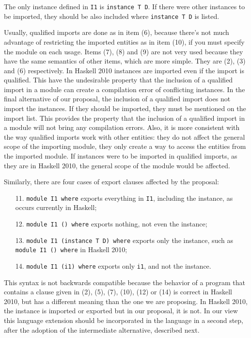 \documentclass[msc]{ppgccufmg}
\begin{document}
The only instance defined in \texttt{I1} is
\texttt{instance T D}.  If there were other instances to be imported, they should be also included
where \texttt{instance T D} is listed.

Usually, qualified imports are done as in item (6), because there's not much advantage of restricting the imported entities as in item (10), if you must specify the module on each usage.
Items (7), (8) and (9) are not very used because they have the same semantics of other items, which are more simple.
They are (2), (3) and (6) respectively.
In Haskell 2010 instances are imported even if the import is qualified.
This have the undesirable property that the inclusion of a qualified import in a module can create a compilation error of conflicting instances.
In the final alternative of our proposal, the inclusion of a qualified import does not import the instances.
If they should be imported, they must be mentioned on the import list.
This provides the property that the inclusion of a qualified import in a module will not bring any compilation errors.
Also, it is more consistent with the way qualified imports work with other entities: they do not affect the general scope of the importing module, they only create a way to access the entities from the imported module.
If instances were to be imported in qualified imports, as they are in Haskell 2010, the general scope of the module would be affected.

Similarly, there are four cases of export clauses affected by the proposal:
\begin{enumerate}
\item[11.] \texttt{module I1 where} exports everything in \texttt{I1}, including the
instance, as occurs currently in Haskell;
\item[12.] \texttt{module I1 () where} exports nothing, not even the
  instance;
\item[13.] \texttt{module I1 (instance T D) where} exports only the
  instance, such as \texttt{module I1 () where} in Haskell 2010;
\item[14.] \texttt{module I1 (i1) where} exports only \texttt{i1}, and not the
instance.
\end{enumerate}

This syntax is not backwards compatible because the behavior of a program that
contains a clause given in (2), (5), (7), (10), (12) or (14) is correct in Haskell 2010, but has a
different meaning than the one we are proposing.  In Haskell 2010, the instance
is imported or exported but in our proposal, it is not.  In our view this language extension should
be incorporated in the language in a second step, after the adoption of the intermediate alternative, described next.
\end{document}
